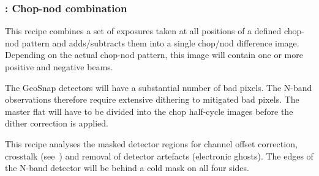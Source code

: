 \subsubsection{:  Chop-nod combination}
\label{img_n_chopnod}
\label{rec:img_n_chopnod}
\label{rec:metis_n_img_chopnod}
\label{sssec:img_n_chopnod}

This recipe combines a set of exposures taken at all positions of a
defined chop-nod pattern and adds/subtracts them into a single
chop/nod difference image. Depending on the actual chop-nod pattern,
this image will contain one or more positive and negative beams.

The GeoSnap detectors will have a substantial number of bad pixels.
The N-band observations therefore require extensive dithering to mitigated bad pixels.
The master flat will have to be divided into the chop half-cycle images before the dither correction is applied.

This recipe analyses the masked detector regions for channel offset correction, crosstalk (see~\cite{matisse_minutes}) and removal of detector artefacts (electronic ghosts).
The edges of the N-band detector will be behind a cold mask on all four sides.



